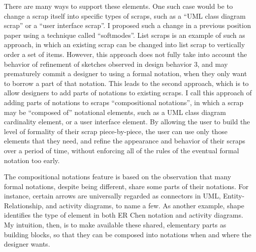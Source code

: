 There are many ways to support these elements. One such case would be to change a scrap itself into specific types of scraps, such as a ``UML class diagram scrap'' or a ``user interface scrap''. I proposed such a change in a previous position paper using a technique called ``softmodes''. List scraps is an example of such as approach, in which an existing scrap can be changed into list scrap to vertically order a set of items. However, this approach does not fully take into account the behavior of refinement of sketches observed in design behavior 3, and may prematurely commit a designer to using a formal notation, when they only want to borrow a part of that notation. This leads to the second approach, which is to allow designers to add parts of notations to existing scraps. I call this approach of adding parts of notations to scraps ``compositional notations'', in which a scrap may be ``composed of'' notational elements, such as a UML class diagram cardinality element, or a user interface element. By allowing the user to build the level of formality of their scrap piece-by-piece, the user can use only those elements that they need, and refine the appearance and behavior of their scraps over a period of time, without enforcing all of the rules of the eventual formal notation too early. 

The compositional notations feature is based on the observation that many formal notations, despite being different, share some parts of their notations. For instance, certain arrows are universally regarded as connectors in UML, Entity-Relationship, and activity diagrams, to name a few. As another example, shape identifies the type of element in both ER Chen notation and activity diagrams. My intuition, then, is to make available these shared, elementary parts as building blocks, so that they can be composed into
notations when and where the designer wants. 

%
%

